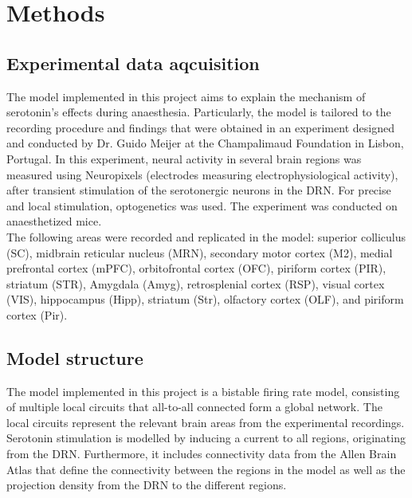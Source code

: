 
\chapter{Methods\label{cha:methods}}


\section{Experimental data aqcuisition}\label{sec:expdata}
\noindent
\indent The model implemented in this project aims to explain the mechanism of serotonin's effects during anaesthesia. Particularly, the model is tailored to the recording procedure and findings that were obtained in an experiment designed and conducted by Dr. Guido Meijer at the Champalimaud Foundation in Lisbon, Portugal. In this experiment, neural activity in several brain regions was measured using Neuropixels (electrodes measuring electrophysiological activity), after transient stimulation of the serotonergic neurons in the DRN. For precise and local stimulation, optogenetics \cite{deisseroth2015optogenetics} was used. The experiment was conducted on anaesthetized mice.\\
\indent The following areas were recorded and replicated in the model: superior colliculus (SC), midbrain reticular nucleus (MRN), secondary motor cortex (M2), medial prefrontal cortex (mPFC), 
orbitofrontal cortex (OFC), piriform cortex (PIR), striatum (STR), Amygdala (Amyg), retrosplenial cortex (RSP),  visual cortex (VIS), hippocampus (Hipp), striatum (Str), olfactory cortex (OLF), and piriform cortex (Pir).

\section{Model structure}

\noindent
\indent The model implemented in this project is a bistable firing rate model, consisting of multiple local circuits that all-to-all connected form a global network. The local circuits represent the relevant brain areas from the experimental recordings. Serotonin stimulation is modelled by inducing a current to all regions, originating from the DRN. Furthermore, it includes connectivity data from the Allen Brain Atlas that define the connectivity between the regions in the model as well as the projection density from the DRN to the different regions.  

